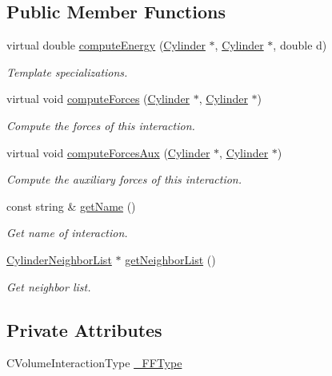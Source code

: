 \subsection*{Public Member Functions}
\begin{DoxyCompactItemize}
\item 
virtual double \hyperlink{classCylinderExclVolume_aecf7fab088af9724172bf3e661f6cd24}{compute\+Energy} (\hyperlink{classCylinder}{Cylinder} $\ast$, \hyperlink{classCylinder}{Cylinder} $\ast$, double d)
\begin{DoxyCompactList}\small\item\em Template specializations. \end{DoxyCompactList}\item 
virtual void \hyperlink{classCylinderExclVolume_a9dc80225d575be7b585bcf28a925c635}{compute\+Forces} (\hyperlink{classCylinder}{Cylinder} $\ast$, \hyperlink{classCylinder}{Cylinder} $\ast$)
\begin{DoxyCompactList}\small\item\em Compute the forces of this interaction. \end{DoxyCompactList}\item 
virtual void \hyperlink{classCylinderExclVolume_a5f7b24639331e4dc42c93c850fcec4af}{compute\+Forces\+Aux} (\hyperlink{classCylinder}{Cylinder} $\ast$, \hyperlink{classCylinder}{Cylinder} $\ast$)
\begin{DoxyCompactList}\small\item\em Compute the auxiliary forces of this interaction. \end{DoxyCompactList}\item 
const string \& \hyperlink{classCylinderVolumeInteractions_ad9a9e25c4567d273dc5347d4d0c1e834}{get\+Name} ()
\begin{DoxyCompactList}\small\item\em Get name of interaction. \end{DoxyCompactList}\item 
\hyperlink{classCylinderNeighborList}{Cylinder\+Neighbor\+List} $\ast$ \hyperlink{classCylinderNLContainer_afce343b3251cf0ed087cf5a62fb6aaee}{get\+Neighbor\+List} ()
\begin{DoxyCompactList}\small\item\em Get neighbor list. \end{DoxyCompactList}\end{DoxyCompactItemize}
\subsection*{Private Attributes}
\begin{DoxyCompactItemize}
\item 
C\+Volume\+Interaction\+Type \hyperlink{classCylinderExclVolume_a715ac884a949e7be970e7ffb636d60c9}{\+\_\+\+F\+F\+Type}
\end{DoxyCompactItemize}


